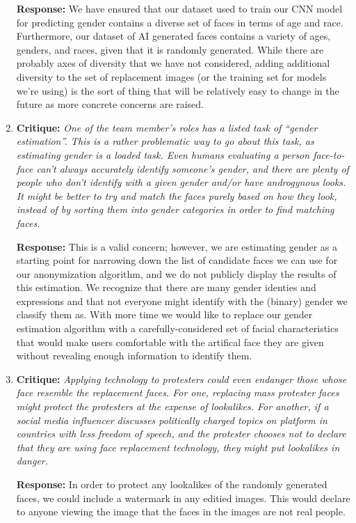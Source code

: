 \begin{enumerate}
    \textbf{Response:} We have ensured that our dataset used to train our CNN model for predicting gender contains a diverse set of faces
    in terms of age and race. Furthermore, our dataset of AI generated faces contains a variety of ages, genders, and races, given
    that it is randomly generated. While there are probably axes of diversity that we have not considered, adding additional diversity to the set of replacement images (or the training set for models we’re using) is the sort of thing that will be relatively easy to change in the future as more concrete concerns are raised.
    \item \textbf{Critique:} \textit{One of the team member’s roles has a listed task of “gender estimation”. This is a
    rather problematic way to go about this task, as estimating gender is a loaded task.
    Even humans evaluating a person face-to-face can’t always accurately identify
    someone’s gender, and there are plenty of people who don’t identify with a given
    gender and/or have androgynous looks. It might be better to try and match the faces
    purely based on how they look, instead of by sorting them into gender categories
    in order to find matching faces.}

    \textbf{Response:} This is a valid concern; however, we are estimating gender as a starting point for narrowing down the list of candidate faces we can use
    for our anonymization algorithm, and we do not publicly display the results of this estimation. We recognize that there are many gender identies and expressions and that not everyone might identify
    with the (binary) gender we classify them as. With more time we would like to replace our gender estimation algorithm with a carefully-considered set of facial characteristics that would make users comfortable with the artifical face they are given without revealing enough information to identify them.

    \item \textbf{Critique:} \textit{Applying technology to protesters could even endanger those whose face resemble
    the replacement faces. For one, replacing mass protester faces might protect the
    protesters at the expense of lookalikes. For another, if a social media influencer
    discusses politically charged topics on platform in countries with less freedom of
    speech, and the protester chooses not to declare that they are using face replacement
    technology, they might put lookalikes in danger.}

    \textbf{Response:} In order to protect any lookalikes of the randomly generated faces, we could include a watermark in any editied images. This would declare to anyone viewing the image
    that the faces in the images are not real people.
\end{enumerate}





